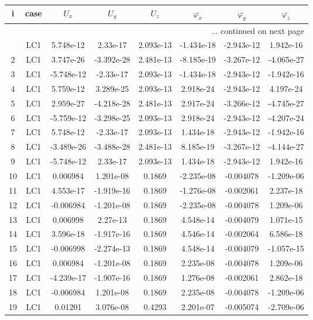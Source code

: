 \documentclass{article}%
\begin{document}
\begin{longtable}{| c c | c c c c c c |}%
\hline%
i&case&$U_x$&$U_y$&$U_z$&$\varphi_x$&$\varphi_y$&$\varphi_z$\\%
\hline%
\endhead%
\hline%
\multicolumn{8}{r}{... continued on next page}\\%
\endfoot%
\hline%
\endlastfoot%
1&LC1&5.748e{-}12&2.33e{-}17&2.093e{-}13&{-}1.434e{-}18&{-}2.943e{-}12&1.942e{-}16\\%
2&LC1&3.747e{-}26&{-}3.392e{-}28&2.481e{-}13&{-}8.185e{-}19&{-}3.267e{-}12&{-}4.065e{-}27\\%
3&LC1&{-}5.748e{-}12&{-}2.33e{-}17&2.093e{-}13&{-}1.434e{-}18&{-}2.943e{-}12&{-}1.942e{-}16\\%
4&LC1&5.759e{-}12&3.289e{-}25&2.093e{-}13&2.918e{-}24&{-}2.943e{-}12&4.197e{-}24\\%
5&LC1&2.959e{-}27&{-}4.218e{-}28&2.481e{-}13&2.917e{-}24&{-}3.266e{-}12&{-}4.745e{-}27\\%
6&LC1&{-}5.759e{-}12&{-}3.298e{-}25&2.093e{-}13&2.918e{-}24&{-}2.943e{-}12&{-}4.207e{-}24\\%
7&LC1&5.748e{-}12&{-}2.33e{-}17&2.093e{-}13&1.434e{-}18&{-}2.943e{-}12&{-}1.942e{-}16\\%
8&LC1&{-}3.489e{-}26&{-}3.488e{-}28&2.481e{-}13&8.185e{-}19&{-}3.267e{-}12&{-}4.144e{-}27\\%
9&LC1&{-}5.748e{-}12&2.33e{-}17&2.093e{-}13&1.434e{-}18&{-}2.943e{-}12&1.942e{-}16\\%
10&LC1&0.006984&1.201e{-}08&0.1869&{-}2.235e{-}08&{-}0.004078&{-}1.209e{-}06\\%
11&LC1&4.553e{-}17&{-}1.919e{-}16&0.1869&{-}1.276e{-}08&{-}0.002061&2.237e{-}18\\%
12&LC1&{-}0.006984&{-}1.201e{-}08&0.1869&{-}2.235e{-}08&{-}0.004078&1.209e{-}06\\%
13&LC1&0.006998&2.27e{-}13&0.1869&4.548e{-}14&{-}0.004079&1.071e{-}15\\%
14&LC1&3.596e{-}18&{-}1.917e{-}16&0.1869&4.546e{-}14&{-}0.002064&6.586e{-}18\\%
15&LC1&{-}0.006998&{-}2.274e{-}13&0.1869&4.548e{-}14&{-}0.004079&{-}1.057e{-}15\\%
16&LC1&0.006984&{-}1.201e{-}08&0.1869&2.235e{-}08&{-}0.004078&1.209e{-}06\\%
17&LC1&{-}4.239e{-}17&{-}1.907e{-}16&0.1869&1.276e{-}08&{-}0.002061&2.862e{-}18\\%
18&LC1&{-}0.006984&1.201e{-}08&0.1869&2.235e{-}08&{-}0.004078&{-}1.209e{-}06\\%
19&LC1&0.01201&3.076e{-}08&0.4293&2.201e{-}07&{-}0.005074&{-}2.709e{-}06\\%

\end{longtable}
\end{document}
